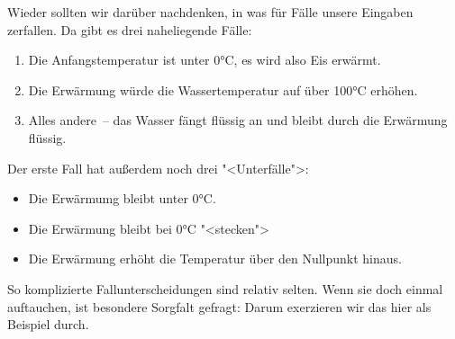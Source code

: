 %
Wieder sollten wir darüber nachdenken, in was für Fälle unsere
Eingaben zerfallen.  Da gibt es drei naheliegende Fälle:
%
\begin{enumerate}
\item Die Anfangstemperatur ist unter 0°C, es wird also Eis erwärmt.
\item Die Erwärmung würde die Wassertemperatur auf über 100°C erhöhen.
\item Alles andere~-- das Wasser fängt flüssig an und bleibt durch die
  Erwärmung flüssig.
\end{enumerate}
%
Der erste Fall hat außerdem noch drei "<Unterfälle">:
%
\begin{itemize}
\item Die Erwärmumg bleibt unter 0°C.
\item Die Erwärmung bleibt bei  0°C "<stecken">
\item Die Erwärmung erhöht die Temperatur über den Nullpunkt hinaus.
\end{itemize}
%
So komplizierte Fallunterscheidungen sind relativ selten. Wenn sie
doch einmal auftauchen, ist besondere Sorgfalt gefragt: Darum
exerzieren wir das hier als Beispiel durch.

